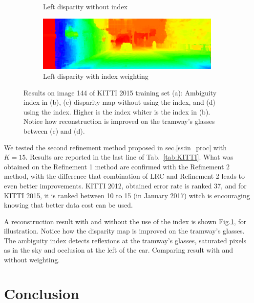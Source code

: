 \documentclass{article}
\begin{document}
\begin{figure}
\begin{subfigure}[t]{0.98\linewidth}
                \caption{Left disparity without index}
        \end{subfigure}        
        \begin{subfigure}[t]{0.98\linewidth}
                \includegraphics[width=0.99\linewidth]{Figures/144_10_df_}
                \caption{Left disparity with index weighting}
        \end{subfigure}        
        \caption{Results on image 144 of KITTI 2015 training set (a): Ambiguity index in (b), (c) disparity map without using the index, and (d) using the index. Higher is the index whiter is the index in (b).  Notice how reconstruction is improved on the tramway's glasses between (c) and (d).}
        \label{fig:disp}
\end{figure}

We tested the second refinement method proposed in sec.\ref{ss:in_proc} with $K=15$. Results are reported in the last line of Tab.~\ref{tab:KITTI}. What was obtained on the Refinement 1 method are confirmed with the Refinement 2 method, with the difference that combination of LRC and Refinement 2 leads to even better improvements. KITTI 2012, obtained error rate is ranked 37, and for KITTI 2015, it is ranked between 10 to 15 (in January 2017) witch is encouraging knowing that better data cost can be used.

A reconstruction result with and without the use of the index is shown Fig.\ref{fig:disp}, for illustration. Notice how the disparity map is improved on the tramway's glasses. The ambiguity index detects reflexions at the tramway's glasses, saturated pixels as in the sky and occlusion at the left of the car. Comparing result with and without weighting.

\section{Conclusion}
\label{sec:conclusion}
\end{document}
